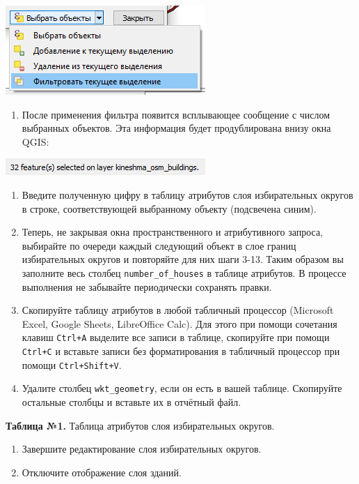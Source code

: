 \documentclass[
  12pt,
]{book}
\providecommand{\tightlist}{%
  \setlength{\itemsep}{0pt}\setlength{\parskip}{0pt}}
\begin{document}
\includegraphics{images/Ex05/selection5.png}

\begin{enumerate}
\def\labelenumi{\arabic{enumi}.}
\setcounter{enumi}{11}
\tightlist
\item
  После применения фильтра появится всплывающее сообщение с числом выбранных объектов. Эта информация будет продублирована внизу окна QGIS:
\end{enumerate}

\includegraphics{images/Ex05_Vectorization/select_from_selection.png}

\begin{enumerate}
\def\labelenumi{\arabic{enumi}.}
\setcounter{enumi}{12}
\item
  Введите полученную цифру в таблицу атрибутов слоя избирательных округов в строке, соответствующей выбранному объекту (подсвечена синим).
\item
  Теперь, не закрывая окна пространственного и атрибутивного запроса, выбирайте по очереди каждый следующий объект в слое границ избирательных округов и повторяйте для них шаги 3-13. Таким образом вы заполните весь столбец \texttt{number\_of\_houses} в таблице атрибутов. В процессе выполнения не забывайте периодически сохранять правки.
\item
  Скопируйте таблицу атрибутов в любой табличный процессор (Microsoft Excel, Google Sheets, LibreOffice Calc). Для этого при помощи сочетания клавиш \texttt{Ctrl+A} выделите все записи в таблице, скопируйте при помощи \texttt{Ctrl+C} и вставьте записи без форматирования в табличный процессор при помощи \texttt{Ctrl+Shift+V}.
\item
  Удалите столбец \texttt{wkt\_geometry}, если он есть в вашей таблице. Скопируйте остальные столбцы и вставьте их в отчётный файл.
\end{enumerate}

\textbf{Таблица №1.} Таблица атрибутов слоя избирательных округов.

\begin{enumerate}
\def\labelenumi{\arabic{enumi}.}
\setcounter{enumi}{17}
\item
  Завершите редактирование слоя избирательных округов.
\item
  Отключите отображение слоя зданий.
\end{enumerate}
\end{document}
